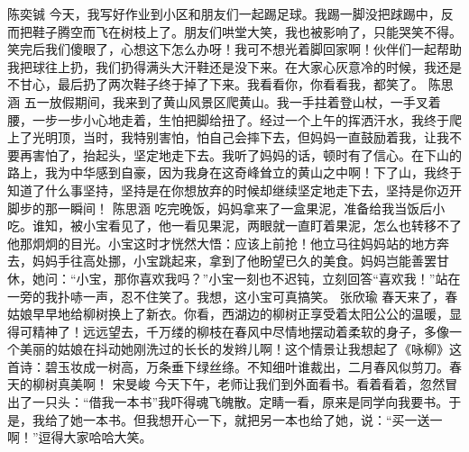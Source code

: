 {}\markdownRendererInterblockSeparator
{}陈奕铖\markdownRendererInterblockSeparator
{}今天，我写好作业到小区和朋友们一起踢足球。我踢一脚没把䟵踢中，反而把鞋子腾空而飞在树枝上了。朋友们哄堂大笑，我也被影响了，只能哭笑不得。笑完后我们傻眼了，心想这下怎么办呀！我可不想光着脚回家啊！伙伴们一起帮助我把球往上扔，我们扔得满头大汗鞋还是没下来。在大家心灰意冷的时候，我还是不甘心，最后扔了两次鞋子终于掉了下来。我看看你，你看看我，都笑了。\markdownRendererInterblockSeparator
{}\markdownRendererInterblockSeparator
{}陈思涵\markdownRendererInterblockSeparator
{}五一放假期间，我来到了黄山风景区爬黄山。我一手拄着登山杖，一手叉着腰，一步一步小心地走着，生怕把脚给扭了。经过一个上午的挥洒汗水，我终于爬上了光明顶，当时，我特别害怕，怕自己会摔下去，但妈妈一直鼓励着我，让我不要再害怕了，抬起头，坚定地走下去。我听了妈妈的话，顿时有了信心。在下山的路上，我为中华感到自豪，因为我身在这奇峰耸立的黄山之中啊！下了山，我终于知道了什么事坚持，坚持是在你想放弃的时候却继续坚定地走下去，坚持是你迈开脚步的那一瞬间！\markdownRendererInterblockSeparator
{}\markdownRendererInterblockSeparator
{}陈思涵\markdownRendererInterblockSeparator
{}吃完晚饭，妈妈拿来了一盒果泥，准备给我当饭后小吃。谁知，被小宝看见了，他一看见果泥，两眼就一直盯着果泥，怎么也转移不了他那炯炯的目光。小宝这时才恍然大悟：应该上前抢！他立马往妈妈站的地方奔去，妈妈手往高处挪，小宝跳起来，拿到了他盼望已久的美食。妈妈岂能善罢甘休，她问：“小宝，那你喜欢我吗？”小宝一刻也不迟钝，立刻回答“喜欢我！”站在一旁的我扑哧一声，忍不住笑了。我想，这小宝可真搞笑。\markdownRendererInterblockSeparator
{}\markdownRendererInterblockSeparator
{}张欣瑜\markdownRendererInterblockSeparator
{}春天来了，春姑娘早早地给柳树换上了新衣。你看，西湖边的柳树正享受着太阳公公的温暖，显得可精神了！远远望去，千万缕的柳枝在春风中尽情地摆动着柔软的身子，多像一个美丽的姑娘在抖动她刚洗过的长长的发辫儿啊！这个情景让我想起了《咏柳》这首诗：碧玉妆成一树高，万条垂下绿丝绦。不知细叶谁裁出，二月春风似剪刀。春天的柳树真美啊！\markdownRendererInterblockSeparator
{}\markdownRendererInterblockSeparator
{}宋旻峻\markdownRendererInterblockSeparator
{}今天下午，老师让我们到外面看书。看着看着，忽然冒出了一只头：“借我一本书”我吓得魂飞魄散。定睛一看，原来是同学向我要书。于是，我给了她一本书。但我想开心一下，就把另一本也给了她，说：“买一送一啊！”逗得大家哈哈大笑。\markdownRendererInterblockSeparator
{}\markdownRendererInterblockSeparator
